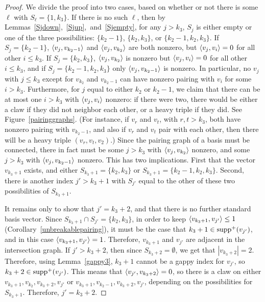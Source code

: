 \begin{proof}
We divide the proof into two cases, based on whether or not there is some $\ell$ with $S_\ell = \{1,k_3\}$. If there is no such $\ell$, then by Lemmas~\ref{Sjdown},~\ref{Sjup},~and~\ref{Sjempty}, for any $j > k_3$, $S_j$ is either empty or one of the three possibilities: $\{k_2 - 1\}$, $\{k_2,k_3\}$, or $\{k_2 - 1, k_2, k_3\}$. If $S_j=\{k_2 - 1\}$, $\left\langle v_j , v_{k_2 - 1} \right\rangle$ and $\left\langle v_j , v_{k_2} \right\rangle$ are both nonzero, but $\left\langle v_j , v_i \right\rangle = 0$ for all other $i \le k_3$. If $S_j=\{k_2,k_3\}$, $\left\langle v_j , v_{k_2} \right\rangle$ is nonzero but $\left\langle v_j , v_i \right\rangle = 0$ for all other $i \le k_3$, and if $S_j=\{k_2-1,k_2,k_3\}$ only $\left\langle v_j , v_{k_2 - 1} \right\rangle$ is nonzero. In particular, no $v_j$ with $j \le k_3$ except for $v_{k_2}$ and $v_{k_2 - 1}$ can have nonzero pairing with $v_i$ for some $i > k_3$. Furthermore, for $j$ equal to either $k_2$ or $k_2 - 1$, we claim that there can be at most one $i > k_3$ with $\left\langle v_j , v_i \right\rangle$ nonzero: if there were two, there would be either a claw if they did not neighbor each other, or a heavy triple if they did. See Figure~\ref{pairinggraphs}. (For instance, if $v_r$ and $v_t$, with $r, t >k_3$, both have nonzero pairing with $v_{k_2-1}$, and also if $v_r$ and $v_t$ pair with each other, then there will be a heavy triple $(v_r, v_t, v_2)$.) Since the pairing graph of a basis must be connected, there in fact must be some $j > k_3$ with $\left\langle v_j , v_{k_2} \right\rangle$ nonzero, and some $j > k_3$ with $\left\langle v_j , v_{k_2-1} \right\rangle$ nonzero. This has two implications. First that the vector $v_{k_3+1}$ exists, and either $S_{k_3 + 1}=\{k_2,k_3\}$ or $S_{k_3 + 1}=\{k_2 - 1, k_2, k_3\}$. Second, there is another index $j' > k_3+1$ with $S_{j'}$ equal to the other of these two possibilities of $S_{k_3+1}$.

It remains only to show that $j' = k_3 +2$, and that there is no further standard basis vector. Since $S_{k_3 + 1}\cap S_{j'}=\{k_2,k_3\}$, in order to keep $\left\langle v_{k_3 + 1} , v_{j'} \right\rangle \le 1$ (Corollary~\ref{unbreakablepairing}), it must be the case that $k_3 + 1 \in \operatorname{supp}^+(v_{j'})$, and in this case $\left\langle v_{k_3 + 1} , v_{j'} \right\rangle = 1$. Therefore, $v_{k_3 + 1}$ and $v_{j'}$ are adjacent in the intersection graph. If $j' > k_3 + 2$, then since $S_{k_3 + 2} = \emptyset$, we get that $|v_{k_3 + 2}| = 2$. Therefore, using Lemma~\ref{gappy3}, $k_3 + 1$ cannot be a gappy index for $v_{j'}$, so $k_3 + 2 \in \operatorname{supp}^+(v_{j'})$. This means that $\left\langle v_{j'} , v_{k_3 + 2} \right\rangle = 0$, so there is a claw on either $v_{k_3 + 1}, v_{k_2}, v_{k_3 + 2}, v_{j'}$ or $v_{k_3 + 1}, v_{k_2-1}, v_{k_3 + 2}, v_{j'}$, depending on the possibilities for $S_{k_3+1}$. Therefore, $j' = k_3 + 2$.


\end{proof}
